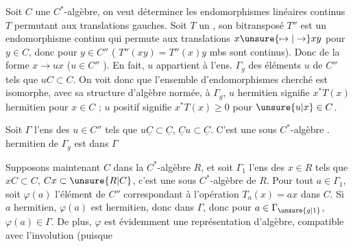 Soit $C$ une $C^*$-algèbre, on veut déterminer les  endomorphismes linéaires continus $T$ permutant aux translations gauches. Soit $T$ un , son bitransposé $T''$ est un endomorphisme  continu  qui permute aux translations $x\unsure{\mapsto|\to}xy$  pour $y\in C$, donc pour  $y\in C''$ ( $T''(xy)=T''(x)y$   mbs sont  continus). Donc de la forme $x\to ux$ ($u\in C''$ ). En fait, $u$ appartient à l'ens. $\Gamma_g$ des éléments $u$ de $C''$ tels que $uC\subset C$. On voit donc que l'ensemble d'endomorphismes cherché est isomorphe, avec sa structure d'algèbre normée, à $\Gamma_g$,  $u$ hermitien signifie $x^*T(x)$ hermitien pour  $x\in C$ ; $u$ positif signifie $x^*T(x)\geq 0$ pour  $\unsure{u|x}\in C$.

Soit  $\Gamma$ l'ens des $u\in C''$ tels que $u\underline{C}\subset\underline{C}$, $\underline{C}u\subset\underline{C}$. C'est une sous $C^*$-algèbre .    hermitien de $\Gamma_g$ est dans $\Gamma$

Supposons maintenant $C$  dans la $C^*$-algèbre $R$, et soit $\Gamma_1$ l'ens des $x\in R$ tels que $xC\subset C$, $Cx\subset \unsure{R|C}$, c'est une sous $C^*$-algèbre de $R$. Pour tout $a\in\Gamma_1$, soit $\varphi(a)$ l'élément de $C''$ correspondant à l'opération $T_a(x)=ax$ dans $C$. Si $a$ hermitien, $\varphi(a)$ est hermitien, donc dans $\Gamma$, donc pour  $a\in\Gamma_{\unsure{g|1}}$, $\varphi(a)\in\Gamma$. De plus, $\varphi$ est évidemment une représentation d'algèbre, compatible avec l'involution (puisque


